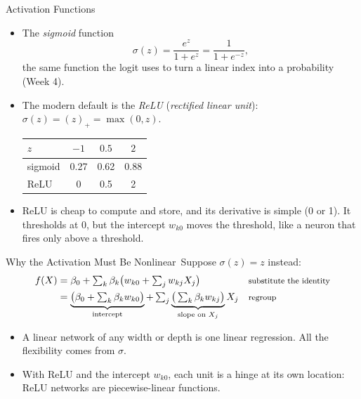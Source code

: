 \documentclass[aspectratio=169,11pt,xcolor=dvipsnames]{beamer}
\newcommand{\core}{\,\raisebox{0.6pt}{\textcolor{corestar}{$\bigstar$}}}
\begin{document}
\begin{frame}{Activation Functions\core}
\begin{itemize}\itemsep4pt
  \item The \textit{sigmoid} function
  \[
    \sigma(z) = \frac{e^z}{1+e^z} = \frac{1}{1+e^{-z}},
  \]
        the same function the logit uses to turn a linear index into a probability
        (Week 4).
  \item The modern default is the \textit{ReLU} (\textit{rectified linear unit}):
        $\sigma(z) = (z)_+ = \max(0, z)$.
  \begin{center}\small
  \begin{tabular}{@{}lccc@{}}
  \toprule
  $z$ & $-1$ & $0.5$ & $2$ \\
  \midrule
  sigmoid & 0.27 & 0.62 & 0.88 \\
  ReLU & 0 & 0.5 & 2 \\
  \bottomrule
  \end{tabular}
  \end{center}
  \item ReLU is cheap to compute and store, and its derivative is simple (0 or 1).
        It thresholds at 0, but the intercept $w_{k0}$ moves the threshold, like a
        neuron that fires only above a threshold.
\end{itemize}
\end{frame}

\begin{frame}{Why the Activation Must Be Nonlinear\core}
Suppose $\sigma(z) = z$ instead:
\begin{align*}
  f(X) &= \beta_0 + \textstyle\sum_k \beta_k\big(w_{k0} + \sum_j w_{kj}X_j\big)
   && \text{\footnotesize substitute the identity} \\
  &= \underbrace{\big(\beta_0 + \textstyle\sum_k\beta_k w_{k0}\big)}_{\text{intercept}}
   + \textstyle\sum_j \underbrace{\big(\textstyle\sum_k \beta_k w_{kj}\big)}_{\text{slope on } X_j} X_j
   && \text{\footnotesize regroup}
\end{align*}
\begin{itemize}\itemsep3pt
  \item \alert{A linear network of any width or depth is one linear regression.}
        All the flexibility comes from $\sigma$.
  \item With ReLU and the intercept $w_{k0}$, each unit is a hinge at its own
        location: ReLU networks are piecewise-linear functions.
\end{itemize}
\end{frame}
\end{document}
